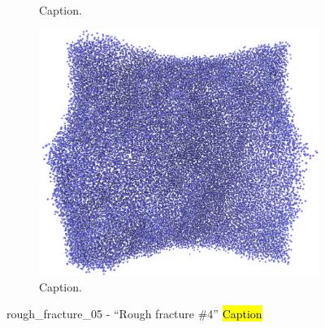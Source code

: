 \begin{figure}[htpb]
\begin{subfigure}[b]{\myfigwidth}
        \caption{Caption.}%
    \end{subfigure}%
    \hfill%
    \begin{subfigure}[b]{\myfigwidth}%
        \centering%
        \includegraphics[width=\textwidth]{images/systems/trimmed-rough_fracture05_06}%
        \caption{Caption.}%
    \end{subfigure}%
    \caption{%
        rough\_fracture\_05 - ``Rough fracture \#4'' \hl{Caption} %
        \label{fig:renderings_rough_fracture05}%
    }%
\end{figure}%

